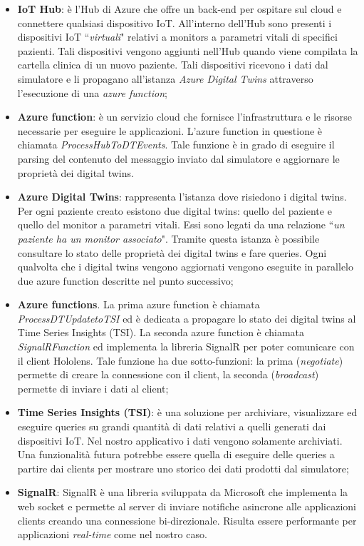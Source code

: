 \begin{itemize}

    \item \textbf{IoT Hub}: è l'Hub di Azure che offre un back-end per ospitare sul cloud e connettere qualsiasi dispositivo IoT. All'interno dell'Hub sono presenti i dispositivi IoT ``\textit{virtuali}" relativi a monitors a parametri vitali di specifici pazienti. Tali dispositivi vengono aggiunti nell'Hub quando viene compilata la cartella clinica di un nuovo paziente. Tali dispositivi ricevono i dati dal simulatore e li propagano all'istanza \textit{Azure Digital Twins} attraverso l'esecuzione di una \textit{azure function};
    
    \item \textbf{Azure function}: è un servizio cloud che fornisce l'infrastruttura e le risorse necessarie per eseguire le applicazioni. L'azure function in questione è chiamata \textit{ProcessHubToDTEvents}. Tale funzione è in grado di eseguire il parsing del contenuto del messaggio inviato dal simulatore e aggiornare le proprietà dei digital twins.
    
    \item \textbf{Azure Digital Twins}: rappresenta l'istanza dove risiedono i digital twins. Per ogni paziente creato esistono due digital twins: quello del paziente e quello del monitor a parametri vitali. Essi sono legati da una relazione ``\textit{un paziente ha un monitor associato}". Tramite questa istanza è possibile consultare lo stato delle proprietà dei digital twins e fare queries. Ogni qualvolta che i digital twins vengono aggiornati vengono eseguite in parallelo due azure function descritte nel punto successivo;
    
    \item \textbf{Azure functions}. La prima azure function è chiamata \textit{ProcessDTUpdatetoTSI} ed è dedicata a propagare lo stato dei digital twins al Time Series Insights (TSI). La seconda azure function è chiamata \textit{SignalRFunction} ed implementa la libreria SignalR per poter comunicare con il client Hololens. Tale funzione ha due sotto-funzioni: la prima (\textit{negotiate}) permette di creare la connessione con il client, la seconda (\textit{broadcast}) permette di inviare i dati al client;
    
    \item \textbf{Time Series Insights (TSI)}: è una soluzione per archiviare, visualizzare ed eseguire queries su grandi quantità di dati relativi a quelli generati dai dispositivi IoT. Nel nostro applicativo i dati vengono solamente archiviati. Una funzionalità futura potrebbe essere quella di eseguire delle queries a partire dai clients per mostrare uno storico dei dati prodotti dal simulatore;
    
    \item \textbf{SignalR}: SignalR è una libreria sviluppata da Microsoft che implementa la web socket e permette al server di inviare notifiche asincrone alle applicazioni clients creando una connessione bi-direzionale. Risulta essere performante per applicazioni \textit{real-time} come nel nostro caso.
\end{itemize}

